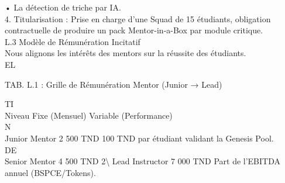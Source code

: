 • La détection de triche par IA.\\
\vspace{0.5em}
4. Titularisation : Prise en charge d’une Squad de 15 étudiants, obligation contractuelle de produire un pack Mentor-in-a-Box par module critique.\\
\vspace{0.5em}
\vspace{0.5em}
\vspace{0.5em}
L.3 Modèle de Rémunération Incitatif\\
Nous alignons les intérêts des mentors sur la réussite des étudiants.\\
\vspace{0.5em}
\vspace{0.5em}
\vspace{0.5em}
\vspace{0.5em}
EL\\
\begin{center}\begin{tabular}TAB. L.1 : Grille de Rémunération Mentor (Junior → Lead)\end{tabular}\end{center}
\vspace{0.5em}
\vspace{0.5em}
\vspace{0.5em}
\vspace{0.5em}
TI\\
Niveau          Fixe (Mensuel) Variable (Performance)\\
\vspace{0.5em}
\vspace{0.5em}
\vspace{0.5em}
\vspace{0.5em}
N\\
Junior Mentor 2 500 TND        100 TND par étudiant validant la Genesis Pool.\\
\vspace{0.5em}
\vspace{0.5em}
\vspace{0.5em}
\vspace{0.5em}
DE\\
Senior Mentor 4 500 TND        2\textbackslash{}%
Lead Instructor 7 000 TND      Part de l’EBITDA annuel (BSPCE/Tokens).\\
\vspace{0.5em}
\vspace{0.5em}
